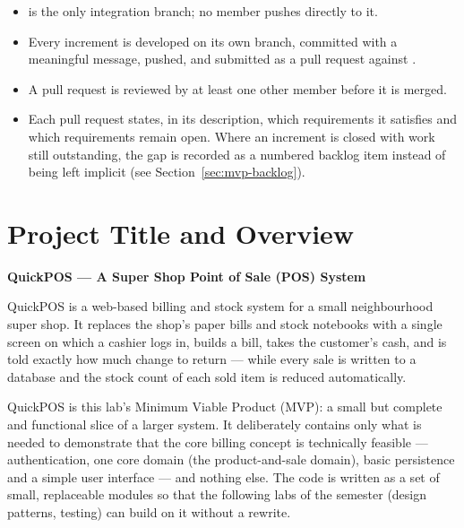 \documentclass[11pt,a4paper]{article}
\newcommand{\code}[1]{\texttt{\small\color{codefg}\detokenize{#1}}}
\newcommand{\filep}[1]{\texttt{\small\color{navy}\detokenize{#1}}}
\begin{document}
\begin{itemize}
  \item \filep{main} is the only integration branch; no member pushes directly to it.
  \item Every increment is developed on its own \code{member/feature} branch, committed with a
        meaningful message, pushed, and submitted as a pull request against \filep{main}.
  \item A pull request is reviewed by at least one other member before it is merged.
  \item Each pull request states, in its description, which requirements it satisfies and
        which requirements remain open. Where an increment is closed with work still
        outstanding, the gap is recorded as a numbered backlog item instead of being left
        implicit (see Section~\ref{sec:mvp-backlog}).
\end{itemize}

\section{Project Title and Overview}

\begin{center}
{\sffamily\bfseries\Large\color{navy} QuickPOS --- A Super Shop Point of Sale (POS) System}
\end{center}

QuickPOS is a web-based billing and stock system for a small neighbourhood super shop. It
replaces the shop's paper bills and stock notebooks with a single screen on which a cashier
logs in, builds a bill, takes the customer's cash, and is told exactly how much change to
return --- while every sale is written to a database and the stock count of each sold item is
reduced automatically.

QuickPOS is this lab's Minimum Viable Product (MVP): a small but complete and functional
slice of a larger system. It deliberately contains only what is needed to demonstrate that
the core billing concept is technically feasible --- authentication, one core domain (the
product-and-sale domain), basic persistence and a simple user interface --- and nothing
else. The code is written as a set of small, replaceable modules so that the following labs
of the semester (design patterns, testing) can build on it without a rewrite.
\end{document}
